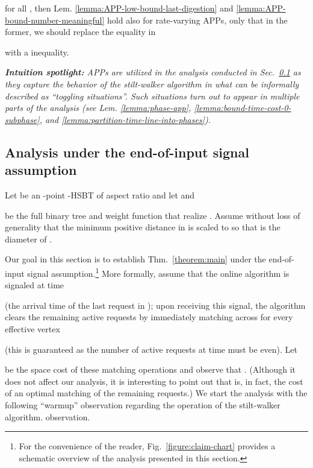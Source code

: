 \documentclass[11pt]{article}
\def\LongVersion{}
\def\LongVersionEnd{}
\def\ShortVersion{}
\def\ShortVersionEnd{}
\theoremstyle{definition}
\theoremstyle{plain}
\theoremstyle{definition}
\theoremstyle{plain}
\theoremstyle{definition}
\theoremstyle{plain}
\newenvironment{IntuitionSpotlight}[0]
{\par \setlength{\leftskip}{0.5\parindent}\setlength{\rightskip}{0.5\parindent}\noindent\itshape\textbf{Intuition spotlight:}}
{\par\ignorespacesafterend}
\newcommand{\NotationLabel}[1]{\label{notationTable:#1}\ignorespaces}
\newcommand{\Sect}{Sec.}
\newcommand{\Thm}{Thm.}
\newcommand{\Lem}{Lem.}
\newcommand{\Fig}{Fig.}
\begin{document}
for all
,
then \Lem{} \ref{lemma:APP-low-bound-last-digestion} and
\ref{lemma:APP-bound-number-meaningful} hold also for rate-varying APPs,
only that in the former, we should replace the equality in

with a  inequality.
\LongVersionEnd 

\begin{IntuitionSpotlight}
APPs are utilized in the analysis conducted in
\Sect{}~\ref{section:analysis-heart} as they capture the behavior of the
stilt-walker algorithm in what can be informally described as ``toggling
situations''.
Such situations turn out to appear in multiple parts of the analysis (see
\Lem{} \ref{lemma:phase-app}, \ref{lemma:bound-time-cost-0-subphase}, and
\ref{lemma:partition-time-line-into-phases}).
\end{IntuitionSpotlight}

\subsection{Analysis under the end-of-input signal assumption}
\label{section:analysis-heart}
Let  be an -point -HSBT of aspect ratio 
and let  and

be the full binary tree and weight function that realize .
Assume without loss of generality that the minimum positive distance in
 is scaled to  so that  is the diameter of
.

Our goal in this section is to establish \Thm{}~\ref{theorem:main} under the
end-of-input signal assumption.\footnote{For the convenience of the reader, \Fig{}~\ref{figure:claim-chart} provides a
schematic overview of the analysis presented in this section.
}
More formally, assume that the online algorithm is signaled at time

\NotationLabel{analysis:end-time}
(the arrival time of the last request in );
upon receiving this signal, the algorithm clears the remaining active
requests by immediately matching across  for every effective vertex

(this is guaranteed as the number of active requests at time  must
be even).
Let

\NotationLabel{analysis:end-cost}
be the space cost of these matching operations and observe that
.
\LongVersion (Although it does not affect our analysis, it is interesting to point out that
 is, in fact, the cost of an optimal matching of the remaining
requests.)
\LongVersionEnd We start the analysis with the following ``warmup''
\LongVersion observation regarding the operation of the stilt-walker algorithm.
\LongVersionEnd \ShortVersion observation.
\ShortVersionEnd 
\end{document}
